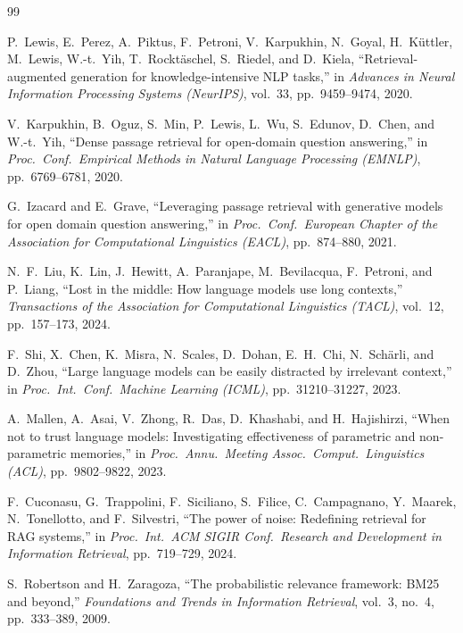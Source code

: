 \documentclass[conference]{IEEEtran}
\begin{document}
\begin{thebibliography}{99}

P.~Lewis, E.~Perez, A.~Piktus, F.~Petroni, V.~Karpukhin, N.~Goyal, H.~K\"{u}ttler, M.~Lewis, W.-t.~Yih, T.~Rockt\"{a}schel, S.~Riedel, and D.~Kiela, ``Retrieval-augmented generation for knowledge-intensive NLP tasks,'' in \emph{Advances in Neural Information Processing Systems (NeurIPS)}, vol.~33, pp.~9459--9474, 2020.

V.~Karpukhin, B.~Oguz, S.~Min, P.~Lewis, L.~Wu, S.~Edunov, D.~Chen, and W.-t.~Yih, ``Dense passage retrieval for open-domain question answering,'' in \emph{Proc.\ Conf.\ Empirical Methods in Natural Language Processing (EMNLP)}, pp.~6769--6781, 2020.

G.~Izacard and E.~Grave, ``Leveraging passage retrieval with generative models for open domain question answering,'' in \emph{Proc.\ Conf.\ European Chapter of the Association for Computational Linguistics (EACL)}, pp.~874--880, 2021.

N.~F.~Liu, K.~Lin, J.~Hewitt, A.~Paranjape, M.~Bevilacqua, F.~Petroni, and P.~Liang, ``Lost in the middle: How language models use long contexts,'' \emph{Transactions of the Association for Computational Linguistics (TACL)}, vol.~12, pp.~157--173, 2024.

F.~Shi, X.~Chen, K.~Misra, N.~Scales, D.~Dohan, E.~H.~Chi, N.~Sch\"{a}rli, and D.~Zhou, ``Large language models can be easily distracted by irrelevant context,'' in \emph{Proc.\ Int.\ Conf.\ Machine Learning (ICML)}, pp.~31210--31227, 2023.

A.~Mallen, A.~Asai, V.~Zhong, R.~Das, D.~Khashabi, and H.~Hajishirzi, ``When not to trust language models: Investigating effectiveness of parametric and non-parametric memories,'' in \emph{Proc.\ Annu.\ Meeting Assoc.\ Comput.\ Linguistics (ACL)}, pp.~9802--9822, 2023.

F.~Cuconasu, G.~Trappolini, F.~Siciliano, S.~Filice, C.~Campagnano, Y.~Maarek, N.~Tonellotto, and F.~Silvestri, ``The power of noise: Redefining retrieval for RAG systems,'' in \emph{Proc.\ Int.\ ACM SIGIR Conf.\ Research and Development in Information Retrieval}, pp.~719--729, 2024.

S.~Robertson and H.~Zaragoza, ``The probabilistic relevance framework: BM25 and beyond,'' \emph{Foundations and Trends in Information Retrieval}, vol.~3, no.~4, pp.~333--389, 2009.


\end{thebibliography}
\end{document}
